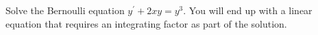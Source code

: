 \documentclass[12pt,letterpaper, onecolumn]{exam}
\begin{document}
\begin{questions}
    \pagebreak %
\thispagestyle{empty}   %
    
    \question[4 Marks] Solve the Bernoulli equation $y^{'} + 2xy = y^3$. You will end up with a linear equation that requires an integrating factor as part of the solution.\droppoints
    
    \begin{solution}
        \\
        \\
        \\
        \\
        \\
        \\
        \\
        \\
        \\
        \\
        \\
        \\
        \\
        \\
        \\
        \\
        \\
        \\
        \\
        \\
        \\
        \\
        \\
        \\
        \\
        \\
        \\
        \\
        \\
        \\
        \\
        \\
        \\
        \\
        \\
        \\
        \\
    \end{solution}
    
\end{questions}
\end{document}
